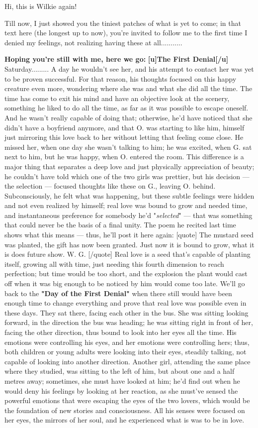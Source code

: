 Hi, this is Wilkie again!

Till now, I just showed you the tiniest patches of what is yet to come; in that text here (the longest up to now), you're invited to follow me to the first time I denied my feelings, not realizing having these at all...........

\textbf{Hoping you're still with me, here we go:}
\textbf{[u]The First Denial[/u]}
Saturday.........
A day he wouldn't see her, and his attempt to contact her was yet to be proven successful. For that reason, his thoughts focused on this happy creature even more, wondering where she was and what she did all the time. 
The time has come to exit his mind and have an objective look at the scenery, something he liked to do all the time, as far as it was possible to escape oneself. 
And he wasn't really capable of doing that; otherwise, he'd have noticed that she didn't have a boyfriend anymore, and that O. was starting to like him, himself just mirroring this love back to her without letting that feeling come close. He missed her, when one day she wasn't talking to him; he was excited, when G. sat next to him, but he was happy, when O. entered the room. This difference is a major thing that separates a deep love and just physically appreciation of beauty; he couldn't have told which one of the two girls was prettier, but his decision --- the selection --- focused thoughts like these on G., leaving O. behind. Subconsciously, he felt what was happening, but these subtle feelings were hidden and not even realized by himself; real love was bound to grow and needed time, and instantaneous preference for somebody he'd "\emph{selected}" --- that was something that could never be the basis of a final unity. The poem he recited last time shows what this means --- thus, he'll post it here again:
[quote]
The mustard seed was planted,
the gift has now been granted. 
Just now it is bound to grow,
what it is does future show.
W. G. 
[/quote]
Real love is a seed that's capable of planting itself, growing all with time, just needing this fourth dimension to reach perfection; but time would be too short, and the explosion the plant would cast off when it was big enough to be noticed by him would come too late. 
We'll go back to the \textbf{"Day of the First Denial"} when there still would have been enough time to change everything and prove that real love was possible even in these days. 
They sat there, facing each other in the bus. She was sitting looking forward, in the direction the bus was heading; he was sitting right in front of her, facing the other direction, thus bound to look into her eyes all the time. His emotions were controlling his eyes, and her emotions were controlling hers; thus, both children or young adults were looking into their eyes, steadily talking, not capable of looking into another direction. Another girl, attending the same place where they studied, was sitting to the left of him, but about one and a half metres away; sometimes, she must have looked at him; he'd find out when he would deny his feelings by looking at her reaction, as she must've sensed the powerful emotions that were escaping the eyes of the two lovers, which would be the foundation of new stories and consciousness. All his senses were focused on her eyes, the mirrors of her soul, and he experienced what is was to be in love. 
